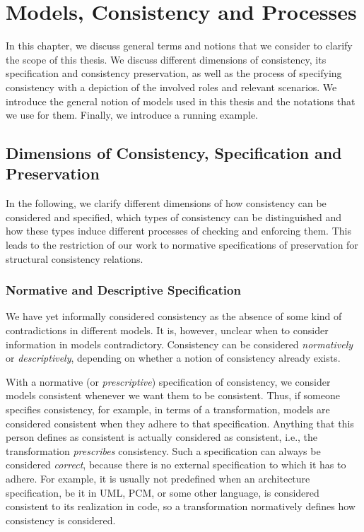 \chapter{Models, Consistency and Processes
}
\label{chap:networks}

In this chapter, we discuss general terms and notions that we consider to clarify the scope of this thesis.
We discuss different dimensions of consistency, its specification and consistency preservation, as well as the process of specifying consistency with a depiction of the involved roles and relevant scenarios.
We introduce the general notion of models used in this thesis and the notations that we use for them.
Finally, we introduce a running example.


\section{Dimensions of Consistency, Specification and Preservation}

In the following, we clarify different dimensions of how consistency can be considered and specified, which types of consistency can be distinguished and how these types induce different processes of checking and enforcing them.
This leads to the restriction of our work to normative specifications of preservation for structural consistency relations.

\subsection{Normative and Descriptive Specification}
\label{chap:networks:notions:normative_descriptive}

We have yet informally considered consistency as the absence of some kind of contradictions in different models.
It is, however, unclear when to consider information in models contradictory.
Consistency can be considered \emph{normatively} or \emph{descriptively}, depending on whether a notion of consistency already exists.

With a normative (or \emph{prescriptive}) specification of consistency, we consider models consistent whenever we want them to be consistent.
Thus, if someone specifies consistency, for example, in terms of a transformation, models are considered consistent when they adhere to that specification.
Anything that this person defines as consistent is actually considered as consistent, i.e., the transformation \emph{prescribes} consistency.
Such a specification can always be considered \emph{correct}, because there is no external specification to which it has to adhere.
For example, it is usually not predefined when an architecture specification, be it in \gls{UML}, \gls{PCM}, or some other language, is considered consistent to its realization in code, so a transformation normatively defines how consistency is considered.

